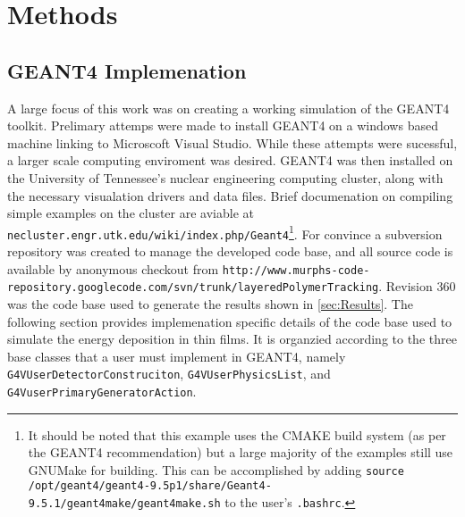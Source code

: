 \section{Methods}
\label{sec:Methods}

\subsection{GEANT4 Implemenation}

A large focus of this work was on creating a working simulation of the GEANT4 toolkit.
Prelimary attemps were made to install GEANT4 on a windows based machine linking to Microscoft Visual Studio. While these attempts were sucessful, a larger scale computing enviroment was desired.
GEANT4 was then installed on the University of Tennessee's nuclear engineering computing cluster, along with the necessary visualation drivers and data files.
Brief documenation on compiling simple examples on the cluster are aviable at \texttt{necluster.engr.utk.edu/wiki/index.php/Geant4}\footnote{It should be noted that this example uses the CMAKE build system (as per the GEANT4 recommendation) but a large majority of the examples still use GNUMake for building. This can be accomplished by adding \verb+source /opt/geant4/geant4-9.5p1/share/Geant4-9.5.1/geant4make/geant4make.sh+ to the user's \verb+.bashrc+.}. 
For convince a subversion repository was created to manage the developed code base, and all source code is available by anonymous checkout from \texttt{http://www.murphs-code-repository.googlecode.com/svn/trunk/layeredPolymerTracking}. Revision 360 was the code base used to generate the results shown in \ref{sec:Results}.
The following section provides implemenation specific details of the code base used to simulate the energy deposition in thin films.
It is organzied according to the three base classes that a user must implement in GEANT4, namely \verb+G4VUserDetectorConstruciton+, \verb+G4VUserPhysicsList+, and \verb+G4VuserPrimaryGeneratorAction+.
